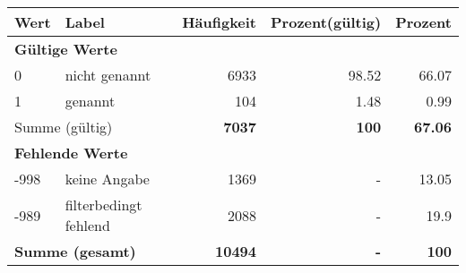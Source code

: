      \begin{longtable}{lXrrr}
     \toprule
     \textbf{Wert} & \textbf{Label} & \textbf{Häufigkeit} & \textbf{Prozent(gültig)} & \textbf{Prozent} \\
     \endhead
     \midrule
     \multicolumn{5}{l}{\textbf{Gültige Werte}}\\

     0 &
     \multicolumn{1}{X}{ nicht genannt   } &


       \num{6933} &
       \num[round-mode=places,round-precision=2]{98,52} &
         \num[round-mode=places,round-precision=2]{66,07} \\

     1 &
     \multicolumn{1}{X}{ genannt   } &


       \num{104} &
       \num[round-mode=places,round-precision=2]{1,48} &
         \num[round-mode=places,round-precision=2]{0,99} \\
     \midrule
     \multicolumn{2}{l}{Summe (gültig)} &
       \textbf{\num{7037}} &
     \textbf{100} &
       \textbf{\num[round-mode=places,round-precision=2]{67,06}} \\
     \multicolumn{5}{l}{\textbf{Fehlende Werte}}\\
       -998 &
       keine Angabe &
         \num{1369} &
        - &
         \num[round-mode=places,round-precision=2]{13,05} \\
       -989 &
       filterbedingt fehlend &
         \num{2088} &
        - &
         \num[round-mode=places,round-precision=2]{19,9} \\
     \midrule
     \multicolumn{2}{l}{\textbf{Summe (gesamt)}} &
          \textbf{\num{10494}} &
        \textbf{-} &
        \textbf{100} \\
     \bottomrule
     \end{longtable}
     
